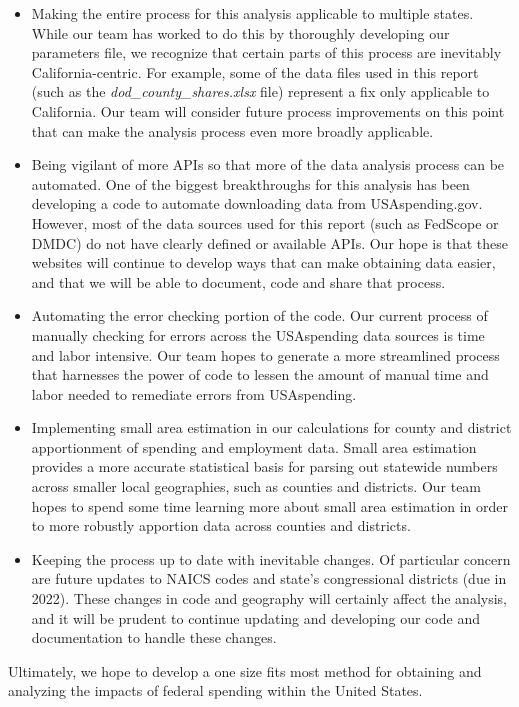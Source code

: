 \documentclass[
]{book}
\providecommand{\tightlist}{%
  \setlength{\itemsep}{0pt}\setlength{\parskip}{0pt}}
\begin{document}
\begin{itemize}
\tightlist
\item
  Making the entire process for this analysis applicable to multiple states. While our team has worked to do this by thoroughly developing our parameters file, we recognize that certain parts of this process are inevitably California-centric. For example, some of the data files used in this report (such as the \emph{dod\_county\_shares.xlsx} file) represent a fix only applicable to California. Our team will consider future process improvements on this point that can make the analysis process even more broadly applicable.
\item
  Being vigilant of more APIs so that more of the data analysis process can be automated. One of the biggest breakthroughs for this analysis has been developing a code to automate downloading data from USAspending.gov. However, most of the data sources used for this report (such as FedScope or DMDC) do not have clearly defined or available APIs. Our hope is that these websites will continue to develop ways that can make obtaining data easier, and that we will be able to document, code and share that process.
\item
  Automating the error checking portion of the code. Our current process of manually checking for errors across the USAspending data sources is time and labor intensive. Our team hopes to generate a more streamlined process that harnesses the power of code to lessen the amount of manual time and labor needed to remediate errors from USAspending.
\item
  Implementing small area estimation in our calculations for county and district apportionment of spending and employment data. Small area estimation provides a more accurate statistical basis for parsing out statewide numbers across smaller local geographies, such as counties and districts. Our team hopes to spend some time learning more about small area estimation in order to more robustly apportion data across counties and districts.
\item
  Keeping the process up to date with inevitable changes. Of particular concern are future updates to NAICS codes and state's congressional districts (due in 2022). These changes in code and geography will certainly affect the analysis, and it will be prudent to continue updating and developing our code and documentation to handle these changes.
\end{itemize}

Ultimately, we hope to develop a one size fits most method for obtaining and analyzing the impacts of federal spending within the United States.
\end{document}
